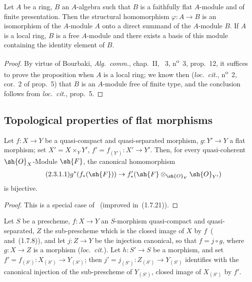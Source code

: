 \begin{proposition}[2.2.17]
\label{IV.2.2.17}
Let $A$ be a ring, $B$ an $A$-algebra such that $B$ is a faithfully flat $A$-module and of finite presentation.
Then the structural homomorphism $\varphi:A\to B$ is an isomorphism of the $A$-module $A$ onto a direct summand of the $A$-module $B$.
If $A$ is a local ring, $B$ is a free $A$-module and there exists a basis of this module containing the identity element of $B$.
\end{proposition}

\begin{proof}
By virtue of Bourbaki, \emph{Alg.~comm.}, chap.~II, \textsection~3, n\textsuperscript{o}~3, prop.~12, it suffices to prove the proposition when $A$ is a local ring; we know then (\emph{loc.~cit.}, n\textsuperscript{o}~2, cor.~2 of prop.~5) that $B$ is an $A$-module free of finite type, and the conclusion follows from \emph{loc.~cit.}, prop.~5.
\end{proof}

\subsection{Topological properties of flat morphisms}
\label{subsection:IV.2.3}

\begin{lemma}[2.3.1]
\label{IV.2.3.1}
Let $f:X\to Y$ be a quasi-compact and quasi-separated morphism, $g:Y'\to Y$ a flat morphism; set $X'=X\times_Y Y'$, $f'=f_{(Y')}:X'\to Y'$.
Then, for every quasi-coherent $\sh{O}_X$-Module $\sh{F}$, the canonical homomorphism
\begin{equation}
\tag{2.3.1.1}
\label{IV.2.3.1.1}
  g^*(f_*(\sh{F})) \to f'_*(\sh{F}\otimes_{\sh{O}_Y}\sh{O}_{Y'})
\end{equation}
is bijective.
\end{lemma}

\begin{proof}
This is a special case of~ (improved in~(1.7.21)).
\end{proof}

\begin{proposition}[2.3.2]
\label{IV.2.3.2}
Let $S$ be a prescheme, $f:X\to Y$ an $S$-morphism quasi-compact and quasi-separated, $Z$ the sub-prescheme which is the closed image of $X$ by $f$~\textnormal{(} and~(1.7.8)\textnormal{)}, and let $j:Z\to Y$ be the injection canonical, so that $f=j\circ g$, where $g:X\to Z$ is a morphism \textnormal{(}\emph{loc.~cit.}\textnormal{)}.
Let $h:S'\to S$ be a morphism, and set $f'=f_{(S')}:X_{(S')}\to Y_{(S')}$; then $j'=j_{(S')}:Z_{(S')}\to Y_{(S')}$ identifies with the canonical injection of the sub-prescheme of $Y_{(S')}$, closed image of $X_{(S')}$ by $f'$.
\end{proposition}

